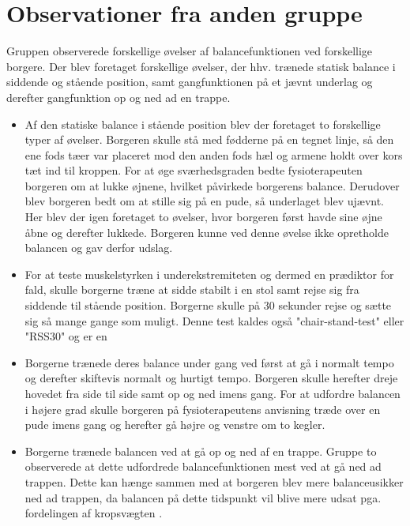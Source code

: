 \section{Observationer fra anden gruppe}
Gruppen observerede forskellige øvelser af balancefunktionen ved forskellige borgere. Der blev foretaget forskellige øvelser, der hhv. trænede statisk balance i siddende og stående position, samt gangfunktionen på et jævnt underlag og derefter gangfunktion op og ned ad en trappe. 
\begin{itemize}
\item Af den statiske balance i stående position blev der foretaget to forskellige typer af øvelser. Borgeren skulle stå med fødderne på en tegnet linje, så den ene fods tæer var placeret mod den anden fods hæl og armene holdt over kors tæt ind til kroppen. For at øge sværhedsgraden bedte fysioterapeuten borgeren om at lukke øjnene, hvilket påvirkede borgerens balance. Derudover blev borgeren bedt om at stille sig på en pude, så underlaget blev ujævnt. Her blev der igen foretaget to øvelser, hvor borgeren først havde sine øjne åbne og derefter lukkede. Borgeren kunne ved denne øvelse ikke opretholde balancen og gav derfor udslag. 
\item For at teste muskelstyrken i underekstremiteten og dermed en prædiktor for fald, skulle borgerne træne at sidde stabilt i en stol samt rejse sig fra siddende til stående position. Borgerne skulle på $30$ sekunder rejse og sætte sig så mange gange som muligt. Denne test kaldes også "chair-stand-test" eller "RSS30" og er en 
\item Borgerne trænede deres balance under gang ved først at gå i normalt tempo og derefter skiftevis normalt og hurtigt tempo. Borgeren skulle herefter dreje hovedet fra side til side samt op og ned imens gang. For at udfordre balancen i højere grad skulle borgeren på fysioterapeutens anvisning træde over en pude imens gang og herefter gå højre og venstre om to kegler.
\item Borgerne trænede balancen ved at gå op og ned af en trappe. Gruppe to observerede at dette udfordrede balancefunktionen mest ved at gå ned ad trappen. Dette kan hænge sammen med at borgeren blev mere balanceusikker ned ad trappen, da balancen på dette tidspunkt vil blive mere udsat pga. fordelingen af kropsvægten . 
\end{itemize} 